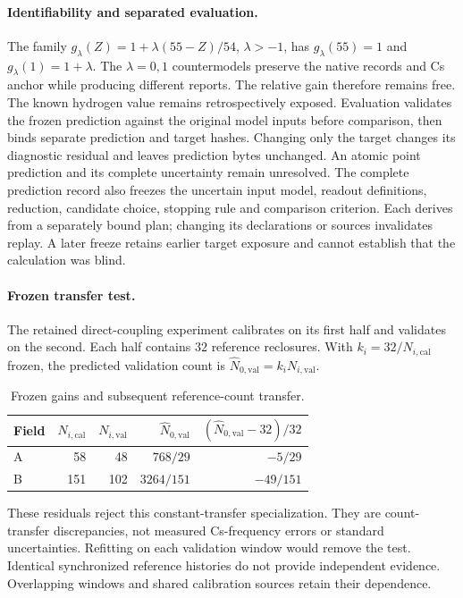 \paragraph{Identifiability and separated evaluation.}
The family \(g_\lambda(Z)=1+\lambda(55-Z)/54\), \(\lambda>-1\), has
\(g_\lambda(55)=1\) and \(g_\lambda(1)=1+\lambda\).
The \(\lambda=0,1\) countermodels preserve the native records and Cs anchor
while producing different reports. The relative gain therefore remains free.
The known hydrogen value remains retrospectively exposed. Evaluation validates
the frozen prediction against the original model inputs before comparison,
then binds separate prediction and target hashes. Changing only the
target changes its diagnostic residual and leaves prediction bytes unchanged.
An atomic point prediction and its complete uncertainty remain unresolved.
The complete prediction record also freezes the uncertain input model,
readout definitions, reduction, candidate choice, stopping rule and comparison
criterion. Each derives from a separately bound plan; changing its declarations
or sources invalidates replay. A later freeze retains earlier target exposure
and cannot establish that the calculation was blind.

\paragraph{Frozen transfer test.}
The retained direct-coupling experiment calibrates on its first half and
validates on the second. Each half contains \(32\) reference reclosures.
With \(k_i=32/N_{i,\mathrm{cal}}\) frozen, the predicted validation count is
\(\widehat N_{0,\mathrm{val}}=k_iN_{i,\mathrm{val}}\).
\begin{table}[H]
\centering
\caption{Frozen gains and subsequent reference-count transfer.}
\label{tab:manual-m3-anchor-transfer}
\begin{tabular}{lrrrr}
\toprule
Field & \(N_{i,\mathrm{cal}}\) & \(N_{i,\mathrm{val}}\) &
 \(\widehat N_{0,\mathrm{val}}\) & \((\widehat N_{0,\mathrm{val}}-32)/32\)\\
\midrule
A & 58 & 48 & \(768/29\) & \(-5/29\)\\
B & 151 & 102 & \(3264/151\) & \(-49/151\)\\
\bottomrule
\end{tabular}
\end{table}
These residuals reject this constant-transfer specialization. They are
count-transfer discrepancies, not measured Cs-frequency errors or standard
uncertainties. Refitting on each validation window would remove the test.
Identical synchronized reference histories do not provide independent
evidence. Overlapping windows and shared calibration sources retain their
dependence.

